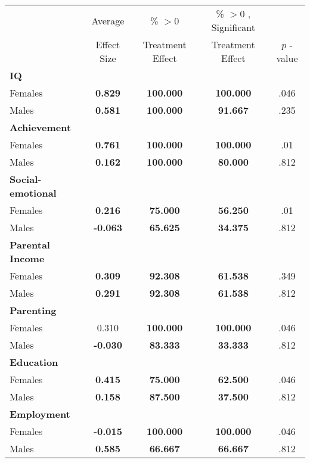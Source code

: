 \begin{tabular}{l c c c c}
\toprule
 & Average & \% $ >0 $ & \% $ >0 $ , Significant & \citet{Rosenbaum_2005_Distribution_JRSS} \\
 & Effect Size & Treatment Effect & Treatment Effect & $ p $ -value \\
\midrule
\textbf{IQ} & & & & \\
\quad Females &  \textbf{    0.829} & \textbf{  100.000} & \textbf{  100.000} & .046 \\
\quad Males &  \textbf{    0.581} & \textbf{  100.000} & \textbf{   91.667} & .235 \\
\midrule
\textbf{Achievement} & & & & \\
\quad Females &  \textbf{    0.761} & \textbf{  100.000} & \textbf{  100.000} & .01 \\
\quad Males &  \textbf{    0.162} & \textbf{  100.000} & \textbf{   80.000} & .812 \\
\midrule
\textbf{Social-emotional} & & & & \\
\quad Females &  \textbf{    0.216} & \textbf{   75.000} & \textbf{   56.250} & .01 \\
\quad Males &  \textbf{   -0.063} & \textbf{   65.625} & \textbf{   34.375} & .812 \\
\midrule
\textbf{Parental Income} & & & & \\
\quad Females &  \textbf{    0.309} & \textbf{   92.308} & \textbf{   61.538} & .349 \\
\quad Males &  \textbf{    0.291} & \textbf{   92.308} & \textbf{   61.538} & .812 \\
\midrule
\textbf{Parenting} & & & & \\
\quad Females &      0.310 & \textbf{  100.000} & \textbf{  100.000} & .046 \\
\quad Males &  \textbf{   -0.030} & \textbf{   83.333} & \textbf{   33.333} & .812 \\
\midrule
\textbf{Education} & & & & \\
\quad Females &  \textbf{    0.415} & \textbf{   75.000} & \textbf{   62.500} & .046 \\
\quad Males &  \textbf{    0.158} & \textbf{   87.500} & \textbf{   37.500} & .812 \\
\midrule
\textbf{Employment} & & & & \\
\quad Females &  \textbf{   -0.015} & \textbf{  100.000} & \textbf{  100.000} & .046 \\
\quad Males &  \textbf{    0.585} & \textbf{   66.667} & \textbf{   66.667} & .812 \\

\end{tabular}
